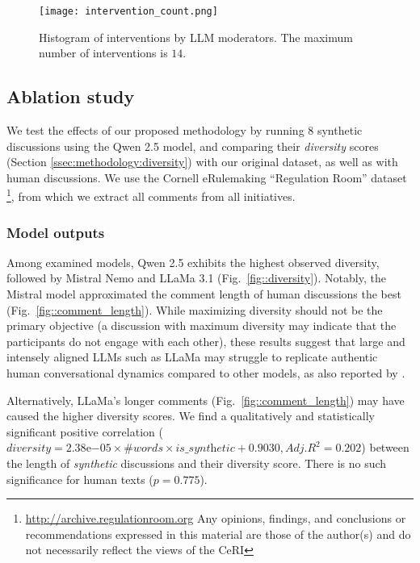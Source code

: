 \begin{figure}
	\centering
	\texttt{[image: intervention\_count.png]}
	\caption{Histogram of interventions by \ac{LLM} moderators. The maximum number of interventions is $14$.}
	\label{fig::intervention_count}
\end{figure}


\subsection{Ablation study}
\label{ssec:results:ablation}

We test the effects of our proposed methodology by running $8$ synthetic discussions using the Qwen 2.5 model, and comparing their \textit{diversity} scores (Section \ref{ssec:methodology:diversity}) with our original dataset, as well as with human discussions. We use the Cornell eRulemaking “Regulation Room” dataset \footnote{\url{http://archive.regulationroom.org} Any opinions, findings, and conclusions or recommendations expressed in this material are those of the author(s) and do not necessarily reflect the views of the \ac{CeRI}}, from which we extract all comments from all initiatives. 


\subsubsection{Model outputs}

Among examined models, Qwen 2.5 exhibits the highest observed diversity, followed by Mistral Nemo and LLaMa 3.1 (Fig.~\ref{fig::diversity}). Notably, the Mistral model approximated the comment length of human discussions the best (Fig.~\ref{fig::comment_length}). While maximizing diversity should not be the primary objective (a discussion with maximum diversity may indicate that the participants do not engage with each other), these results suggest that large and intensely aligned \acp{LLM} such as LLaMa may struggle to replicate authentic human conversational dynamics compared to other models, as also reported by \citep{Park2023GenerativeAI}.

Alternatively, LLaMa's longer comments (Fig.~\ref{fig::comment_length}) may have caused the higher diversity scores. We find a qualitatively and statistically significant positive correlation ($\textit{diversity} = 2.38\mathrm{e}{-05} \times \textit{\#words} \times \textit{is\_synthetic} + 0.9030, Adj. R^2=0.202$) between the length of \textit{synthetic} discussions and their diversity score. There is no such significance for human texts ($p=0.775$).


